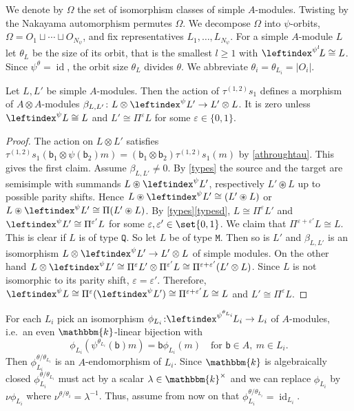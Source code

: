 \documentclass[a4paper,11pt]{amsart}
\numberwithin{equation}{subsection}
\theoremstyle{definition}
\theoremstyle{theorem}
\theoremstyle{remark}
\newcommand\bb{\mathsf{b}}
\newcommand\op{\operatorname}
\newcommand\kk{\mathbbm{k}}
\begin{document}
We denote by $\Omega$ the set of isomorphism classes of simple $A$-modules. Twisting by the
Nakayama automorphism permutes $\Omega$. We decompose $\Omega$ into $\psi$-orbits,
$\Omega=O_1\sqcup\cdots\sqcup O_{N_\psi}$, and fix representatives $L_1,\dots,L_{N_\psi}$.
For a simple $A$-module $L$ let $\theta_L$ be the size of its orbit, that is the smallest
$l\ge1$ with $\leftindex^{\psi^{l}}\!L\cong L$. Since $\psi^\theta=\op{id}$, the orbit size $\theta_L$
divides $\theta$. We abbreviate $\theta_i=\theta_{L_i}=|O_i|$.

\begin{Lemma}\label{tausi}  Let  $L, L'$ be simple $A$-modules.
  Then the  action of $\tau^{(1,2)}s_1$ defines a morphism of $A\otimes
  A$-modules $\beta_{L,L'}\colon L\otimes\leftindex^{\psi}L'\to L'\otimes L$.  It is zero
  unless $\leftindex^{\psi}L\cong L$ and $L'\cong\Pi^\varepsilon L$ for some $\varepsilon\in\{0,1\}$.
\end{Lemma}

\begin{proof}The action on $L\otimes L'$ satisfies $\tau^{(1,2)}s_1(\bb_1\otimes\psi(\bb_2)m)
   =(\bb_1\otimes \bb_2) \tau^{(1,2)}s_1(m)$  by \autoref{athroughtau}. This gives the first claim.
Assume $\beta_{L,L'}\ne0$.  By \autoref{types} the source and the target are semisimple with summands $L\circledast\leftindex^{\psi}L'$, respectively
$L'\circledast L$ up to possible parity shifts.
  Hence $L\circledast\leftindex^{\psi}L'\cong (L'\circledast L)$ or $L\circledast\leftindex^{\psi}L'\cong\Pi(L'\circledast L)$. By  \autoref{types}\autoref{typesd}, $L\cong\Pi^{\varepsilon}L'$ and
$\leftindex^{\psi}L'\cong\Pi^{\varepsilon'}L$ for some $\varepsilon,\varepsilon'\in\set{0,1}$. We claim that $\Pi^{\varepsilon+\varepsilon'}L\cong L$. This is clear if $L$ is of type $\mathtt Q$. So let $L$ be of type $\mathtt M$. Then so is $L'$ and $\beta_{L,L'}$ is an isomorphism $L\otimes\leftindex^{\psi}L'\to L'\otimes L$ of simple modules. On the other hand $L\otimes\leftindex^{\psi}L'\cong\Pi^{\varepsilon}L'\otimes\Pi^{\varepsilon'}L\cong\Pi^{\varepsilon+\varepsilon'}(L'\otimes L)$. Since $L$ is not isomorphic to its parity shift, $\varepsilon=\varepsilon'$.
 Therefore,
$\leftindex^{\psi}L\cong\Pi^{\varepsilon}(\leftindex^{\psi}L')\cong\Pi^{\varepsilon+\varepsilon'}L\cong L$
and $L'\cong\Pi^{\varepsilon}L$.
\end{proof}

For each $L_i$ pick an isomorphism
$\phi_{L_i}\colon\!\!\leftindex^{\psi^{\theta_{L_i}}}\!L_i\to L_i$ of $A$-modules, i.e.\ an
even $\kk$-linear bijection with
\begin{equation}\label{E:phiL}
  \phi_{L_i}(\psi^{\theta_{L_i}}(\bb)m)=\bb \phi_{L_i}(m)\quad \text{for $\bb\in A,\ m\in L_i$.}
\end{equation}
Then $\phi_{L_i}^{\theta/\theta_{L_i}}$ is an $A$-endomorphism of $L_i$. Since $\kk$ is algebraically closed
$\phi_{L_i}^{\theta/\theta_{L_i}}$ must act by a
scalar $\lambda\in\kk^\times$ and we can replace
$\phi_{L_i}$ by $\nu\phi_{L_i}$ where  $\nu^{\theta/\theta_i}=\lambda^{-1}$. Thus, assume from now on that  $ \phi_{L_i}^{\theta/\theta_{L_i}}=\op{id}_{L_i}$.
\end{document}
